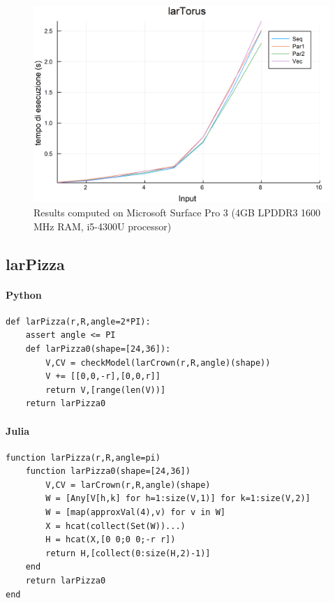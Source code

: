 \documentclass{article}
\begin{document}
\begin{figure}[htbp] 
\centering 
\includegraphics[scale=.13]{larTorusTime.png} 
\caption{Results computed on Microsoft Surface Pro  3 (4GB LPDDR3 1600 MHz RAM, i5-4300U processor)} 
\end{figure}
\subsection{larPizza}

\paragraph{Python}

\begin{verbatim}
def larPizza(r,R,angle=2*PI):
    assert angle <= PI
    def larPizza0(shape=[24,36]):
        V,CV = checkModel(larCrown(r,R,angle)(shape))
        V += [[0,0,-r],[0,0,r]]
        return V,[range(len(V))]
    return larPizza0
\end{verbatim}

\paragraph{Julia}

\begin{verbatim}
function larPizza(r,R,angle=pi)
    function larPizza0(shape=[24,36])
        V,CV = larCrown(r,R,angle)(shape)
        W = [Any[V[h,k] for h=1:size(V,1)] for k=1:size(V,2)]
        W = [map(approxVal(4),v) for v in W]
        X = hcat(collect(Set(W))...)
        H = hcat(X,[0 0;0 0;-r r])
        return H,[collect(0:size(H,2)-1)]
    end
    return larPizza0
end
\end{verbatim}
\end{document}
